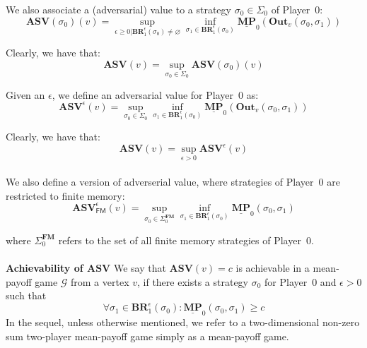 We also associate a (adversarial) value to a strategy $\sigma_0 \in \Sigma_0$ of Player~0: 
\begin{equation*}
    \mathbf{ASV}(\sigma_0)(v) = \sup\limits_{\epsilon \geqslant 0| \mathbf{BR}^{\epsilon}_1(\sigma_0) \neq \varnothing}  \inf \limits_{\sigma_1 \in \mathbf{BR}^{\epsilon}_1(\sigma_0)} \underline{\mathbf{MP}}_0(\mathbf{Out}_v(\sigma_0,\sigma_1))
\end{equation*}

Clearly, we have that:
\begin{equation*}
    \mathbf{ASV}(v) = \sup\limits_{\sigma_0 \in \Sigma_0} \mathbf{ASV}(\sigma_0)(v)
\end{equation*}

Given an $\epsilon$, we define an adversarial value for Player~0 as:
\begin{equation*}
    \mathbf{ASV}^{\epsilon}(v) = \sup\limits_{\sigma_0 \in \Sigma_0}  \inf \limits_{\sigma_1 \in \mathbf{BR}^{\epsilon}_1(\sigma_0)} \underline{\mathbf{MP}}_0(\mathbf{Out}_v(\sigma_0,\sigma_1))
\end{equation*}

Clearly, we have that:
\begin{equation*}
    \mathbf{ASV}(v) = \sup\limits_{\epsilon > 0} \mathbf{ASV}^{\epsilon}(v)
\end{equation*}
\\

We also define a version of adverserial value, where strategies of Player~0 are restricted to finite memory:
\begin{equation*}
\mathbf{ASV}^{\epsilon}_\mathsf{FM}(v) = \sup\limits_{\sigma_0 \in \Sigma_0^{\mathbf{FM}}} \inf\limits_{\sigma_1 \in \mathbf{BR}^{\epsilon}_1(\sigma_0)} \underline{\mathbf{MP}}_0(\sigma_0, \sigma_1)
\end{equation*}

where $\Sigma_0^{\mathbf{FM}}$ refers to the set of all finite memory strategies of Player~0.
\\
\\
\noindent\textbf{Achievability of $\mathbf{ASV}$} We say that $\mathbf{ASV}(v) = c$ is achievable in a mean-payoff game $\mathcal{G}$ from a vertex $v$, if there exists a strategy $\sigma_0$ for Player~0 and $\epsilon > 0$ such that
\begin{equation*}
	\forall \sigma_1 \in \mathbf{BR}^{\epsilon}_{1}(\sigma_0) : \underline{\mathbf{MP}}_0(\sigma_0, \sigma_1) \geqslant c
\end{equation*}
In the sequel, unless otherwise mentioned, we refer to a two-dimensional non-zero sum two-player mean-payoff game simply as a mean-payoff game.